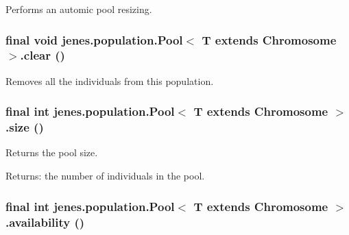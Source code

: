 Performs an automic pool resizing. \hypertarget{classjenes_1_1population_1_1_pool_3_01_t_01extends_01_chromosome_01_4_05198e410de8e3d8d12f5598daf079bd}{
\subsubsection[clear]{\setlength{\rightskip}{0pt plus 5cm}final void jenes.population.Pool$<$ T extends Chromosome $>$.clear ()}}
\label{classjenes_1_1population_1_1_pool_3_01_t_01extends_01_chromosome_01_4_05198e410de8e3d8d12f5598daf079bd}


Removes all the individuals from this population. \hypertarget{classjenes_1_1population_1_1_pool_3_01_t_01extends_01_chromosome_01_4_71999d0d1f42f4448c7615cd43bea2f8}{
\subsubsection[size]{\setlength{\rightskip}{0pt plus 5cm}final int jenes.population.Pool$<$ T extends Chromosome $>$.size ()}}
\label{classjenes_1_1population_1_1_pool_3_01_t_01extends_01_chromosome_01_4_71999d0d1f42f4448c7615cd43bea2f8}


Returns the pool size. 

\begin{Desc}
\item[Returns:]the number of individuals in the pool. \end{Desc}
\hypertarget{classjenes_1_1population_1_1_pool_3_01_t_01extends_01_chromosome_01_4_8e4a835cda9803129b44c952459ed7da}{
\subsubsection[availability]{\setlength{\rightskip}{0pt plus 5cm}final int jenes.population.Pool$<$ T extends Chromosome $>$.availability ()}}
\label{classjenes_1_1population_1_1_pool_3_01_t_01extends_01_chromosome_01_4_8e4a835cda9803129b44c952459ed7da}


